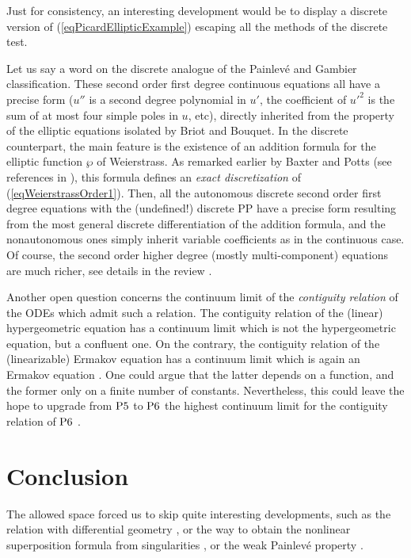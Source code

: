 \documentclass[10pt]{article}
\begin{document}
Just for consistency,
an interesting development would be to display a discrete version of
(\ref{eqPicardEllipticExample})
escaping all the methods of the discrete test.

Let us say a word on the discrete analogue of the Painlev\'e and Gambier
classification.
These second order first degree continuous equations all have a precise form
($u''$ is a second degree polynomial in $u'$,
the coefficient of ${u'}^2$ is the sum of at most four simple poles in $u$,
etc),
directly inherited from the property of the elliptic equations isolated by
Briot and Bouquet.
In the discrete counterpart,
the main feature is the existence 
of an addition formula for the elliptic function $\wp$ of Weierstrass.
As remarked earlier by Baxter and Potts (see references in \cite{CM1998}),
this formula defines an \textit{exact discretization} of 
(\ref{eqWeierstrassOrder1}).
Then,
all the autonomous discrete second order first degree equations with
the (undefined!) discrete PP 
have a precise form resulting from the most general discrete differentiation
of the addition formula,
and the nonautonomous ones simply inherit variable coefficients as in the
continuous case.
Of course, the second order higher degree (mostly multi-component)
equations are much richer,
see details in the review \cite{Cargese1996GNR}.

Another open question concerns the continuum limit of the 
\textit{contiguity relation} of the ODEs which admit such a relation.
The contiguity relation of the (linear) hypergeometric equation
has a continuum limit which is not the hypergeometric equation, 
but a confluent one.
On the contrary, 
the contiguity relation of the (linearizable) Ermakov equation
has a continuum limit which is again an Ermakov equation \cite{Hone1999}.
One could argue that the latter depends on a function,
and the former only on a finite number of constants.
Nevertheless,
this could leave the hope to upgrade from ${\rm P5}$ to ${\rm P6}$ the highest
continuum limit for the 
contiguity relation of ${\rm P6}$ \cite{Okamoto1987I,NRGO,CM2001c}.

\section{Conclusion}

The allowed space forced us to skip quite interesting developments,
such as the relation with differential geometry \cite{BE2000},
or the way to obtain the nonlinear superposition formula
from singularities \cite{MV2000b},
or the weak Painlev\'e property 
\cite[\Lecons\ 5--10,13,19]{PaiLecons} \cite{RDG,GDR1984b}.
\end{document}

